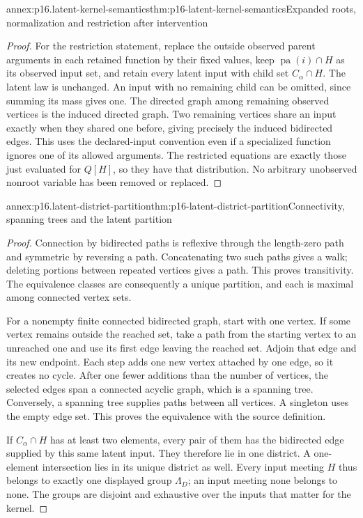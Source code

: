 \begin{annexitem}{annex:p16.latent-kernel-semantics}{thm:p16-latent-kernel-semantics}{Expanded roots, normalization and restriction after intervention}
\begin{proof}
For the restriction statement, replace the outside observed parent
arguments in each retained function by their fixed values, keep
\(\operatorname{pa}(i)\cap H\) as its observed input set, and
retain every latent input with child set \(C_\alpha\cap H\).
The latent law is unchanged. An input with no remaining child can
be omitted, since summing its mass gives one. The directed graph
among remaining observed vertices is the induced directed graph.
Two remaining vertices share an input exactly when they shared one
before, giving precisely the induced bidirected edges. This uses
the declared-input convention even if a specialized function ignores
one of its allowed arguments. The restricted equations are exactly
those just evaluated for \(Q[H]\), so they have that distribution.
No arbitrary unobserved nonroot variable has been removed or replaced.
\end{proof}
\end{annexitem}

\begin{annexitem}{annex:p16.latent-district-partition}{thm:p16-latent-district-partition}{Connectivity, spanning trees and the latent partition}
\begin{proof}
Connection by bidirected paths is reflexive through the length-zero
path and symmetric by reversing a path. Concatenating two such paths
gives a walk; deleting portions between repeated vertices gives a path.
This proves transitivity. The equivalence classes are consequently a
unique partition, and each is maximal among connected vertex sets.

For a nonempty finite connected bidirected graph, start with one
vertex. If some vertex remains outside the reached set, take a path
from the starting vertex to an unreached one and use its first edge
leaving the reached set. Adjoin that edge and its new endpoint.
Each step adds one new vertex attached by one edge, so it creates
no cycle. After one fewer additions than the number of vertices,
the selected edges span a connected acyclic graph, which is a
spanning tree. Conversely, a spanning tree supplies paths between
all vertices. A singleton uses the empty edge set. This proves the
equivalence with the source definition.

If \(C_\alpha\cap H\) has at least two elements, every pair of
them has the bidirected edge supplied by this same latent input.
They therefore lie in one district. A one-element intersection lies
in its unique district as well. Every input meeting \(H\) thus
belongs to exactly one displayed group \(\Lambda_D\); an input
meeting none belongs to none. The groups are disjoint and exhaustive
over the inputs that matter for the kernel.
\end{proof}
\end{annexitem}

